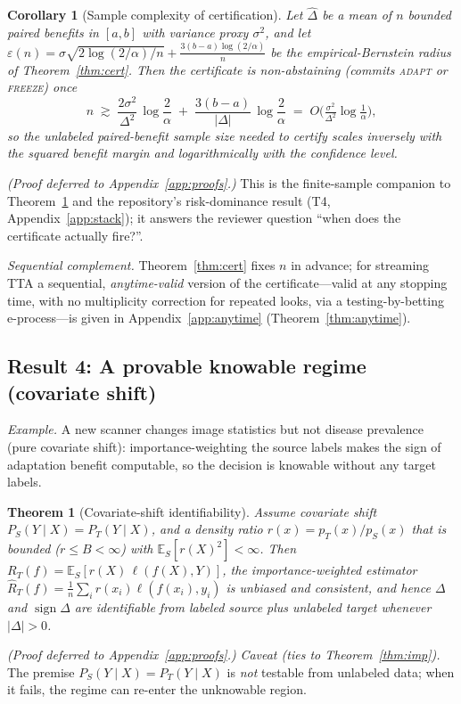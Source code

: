 \documentclass[11pt]{article}
\theoremstyle{plain}
\newtheorem{theorem}{Theorem}
\newtheorem{corollary}{Corollary}
\theoremstyle{definition}
\newcommand{\E}{\mathbb{E}}
\newcommand{\sign}{\operatorname{sign}}
\begin{document}
\begin{corollary}[Sample complexity of certification]\label{cor:samplecomp}
Let $\widehat\Delta$ be a mean of $n$ bounded paired benefits in $[a,b]$ with variance
proxy $\sigma^2$, and let $\varepsilon(n)=\sigma\sqrt{2\log(2/\alpha)/n}+\tfrac{3(b-a)\log(2/\alpha)}{n}$
be the empirical-Bernstein radius of Theorem~\ref{thm:cert}. Then the certificate is
non-abstaining (commits \textsc{adapt} or \textsc{freeze}) once
\[
n\;\gtrsim\;\frac{2\sigma^2}{\Delta^2}\,\log\frac{2}{\alpha}\;+\;\frac{3(b-a)}{|\Delta|}\,\log\frac{2}{\alpha}
\;=\;O\!\Big(\tfrac{\sigma^2}{\Delta^2}\log\tfrac1\alpha\Big),
\]
so the unlabeled paired-benefit sample size needed to certify scales inversely with the
squared benefit margin and logarithmically with the confidence level.
\end{corollary}
\emph{(Proof deferred to Appendix~\ref{app:proofs}.)}
\noindent This is the finite-sample companion to Theorem~\ref{thm:pos} and the
repository's risk-dominance result (T4, Appendix~\ref{app:stack}); it answers the
reviewer question ``when does the certificate actually fire?''.

\noindent\emph{Sequential complement.} Theorem~\ref{thm:cert} fixes $n$ in advance; for
streaming TTA a sequential, \emph{anytime-valid} version of the certificate---valid at any
stopping time, with no multiplicity correction for repeated looks, via a testing-by-betting
e-process---is given in Appendix~\ref{app:anytime} (Theorem~\ref{thm:anytime}).

\subsection{Result 4: A provable knowable regime (covariate shift)}\label{sec:pos}
\noindent\emph{Example.} A new scanner changes image statistics but not disease prevalence (pure
covariate shift): importance-weighting the source labels makes the sign of adaptation benefit
computable, so the decision is knowable without any target labels.
\begin{theorem}[Covariate-shift identifiability]\label{thm:pos}
Assume covariate shift $P_S(Y\mid X)=P_T(Y\mid X)$, and a density ratio
$r(x)=p_T(x)/p_S(x)$ that is bounded ($r\le B<\infty$) with $\E_S[r(X)^2]<\infty$.
Then $R_T(f)=\E_S[r(X)\,\ell(f(X),Y)]$, the importance-weighted estimator
$\widehat R_T(f)=\tfrac1n\sum_i r(x_i)\ell(f(x_i),y_i)$ is unbiased and consistent, and
hence $\Delta$ and $\sign\Delta$ are identifiable from labeled source plus unlabeled
target whenever $|\Delta|>0$.
\end{theorem}
\emph{(Proof deferred to Appendix~\ref{app:proofs}.)}
\noindent\emph{Caveat (ties to Theorem~\ref{thm:imp}).} The premise
$P_S(Y\mid X)=P_T(Y\mid X)$ is \emph{not} testable from unlabeled data; when it fails,
the regime can re-enter the unknowable region.
\end{document}
